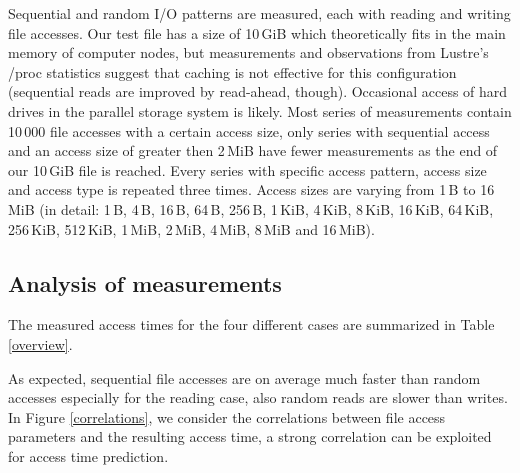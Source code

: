 \documentclass{superfri}
\begin{document}
	Sequential and random I/O patterns are measured, each with reading and writing file accesses.
	Our test file has a size of 10\,GiB which theoretically fits in the main memory of computer nodes, but measurements and observations from Lustre's /proc statistics suggest that caching is not effective for this configuration (sequential reads are improved by read-ahead, though).
	Occasional access of hard drives in the parallel storage system is likely.
	Most series of measurements contain 10\,000 file accesses with a certain access size, only series with sequential access and an access size of greater then 2\,MiB have fewer measurements as the end of our 10\,GiB file is reached.
	Every series with specific access pattern, access size and access type is repeated three times.
	Access sizes are varying from 1\,B to 16\,MiB (in detail:  1\,B, 4\,B, 16\,B, 64\,B, 256\,B, 1\,KiB, 4\,KiB, 8\,KiB, 16\,KiB, 64\,KiB, 256\,KiB, 512\,KiB, 1\,MiB, 2\,MiB, 4\,MiB, 8\,MiB and 16\,MiB).
	
	\subsection{Analysis of measurements}
	\label{sec:measurements}
	The measured access times for the four different cases are summarized in Table\,\ref{overview}.
	
	As expected, sequential file accesses are on average much faster than random accesses especially for the reading case, also random reads are slower than writes. In Figure \ref{correlations}, we consider the correlations between file access parameters and the resulting access time, a strong correlation can be exploited for access time prediction.
	
\end{document}
